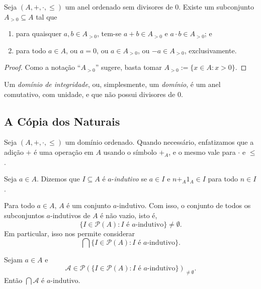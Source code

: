 \begin{proposition}
    Seja $(A,+,\cdot,\leq)$ um anel ordenado sem divisores de $0$. Existe um subconjunto $A_{>0} \subseteq A$ tal que
        \begin{enumerate}[label=\roman*.]
            \item para quaisquer $a,b \in A_{>0}$, tem-se $a+b \in A_{>0}$ e $a \cdot b \in A_{>0}$; e
            \item para todo $a \in A$, ou $a=0$, ou $a \in A_{>0}$, ou $-a \in A_{>0}$, exclusivamente.
        \end{enumerate}
\end{proposition}

\begin{proof}
    Como a notação ``$A_{>0}$'' sugere, basta tomar $A_{>0} := \{x \in A : x > 0\}$. \blackproof
\end{proof}

\begin{definition}
    Um \emph{domínio de integridade}, ou, simplesmente, um \emph{domínio}, é um anel comutativo, com unidade, e que não possui divisores de $0$.
\end{definition}

\subsection*{A Cópia dos Naturais}

Seja $(A,+,\cdot,\leq)$ um domínio ordenado. Quando necessário, enfatizamos que a adição $+$ é uma operação em $A$ usando o símbolo $+_{A}$, e o mesmo vale para $\cdot$ e $\leq$.

\begin{definition}
    Seja $a \in A$. Dizemos que $I \subseteq A$ é $a$-\emph{indutivo} se $a \in I$ e $n +_{A} 1_{A} \in I$ para todo $n \in I$.
\end{definition}

\begin{example}
    Para todo $a \in A$, $A$ é um conjunto $a$-indutivo. Com isso, o conjunto de todos os subconjuntos $a$-indutivos de $A$ é não vazio, isto é,
        \[
            \{ I \in \mathcal{P}{(A)} : I \text{ é } a\text{-indutivo} \} \neq \emptyset.
        \]
    Em particular, isso nos permite considerar
        \[
            \bigcap \{ I \in \mathcal{P}{(A)} : I \text{ é } a\text{-indutivo} \}.
        \]
\end{example}

\begin{proposition}
    Sejam $a \in A$ e
        \[
            \mathcal{A} \in \mathcal{P}{(\{ I \in \mathcal{P}{(A)} : I \text{ é } a\text{-indutivo} \})}_{\neq \emptyset}.
        \]
    Então $\bigcap \mathcal{A}$ é $a$-indutivo.
\end{proposition}


